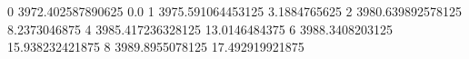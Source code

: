 0 3972.402587890625 0.0
1 3975.591064453125 3.1884765625
2 3980.639892578125 8.2373046875
4 3985.417236328125 13.0146484375
6 3988.3408203125 15.938232421875
8 3989.8955078125 17.492919921875

